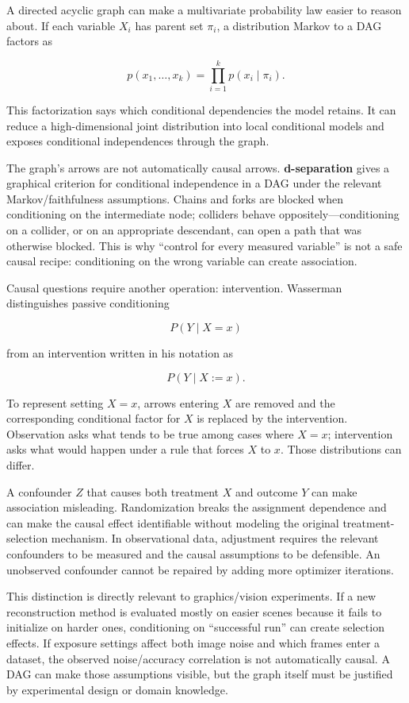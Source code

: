 \hypertarget{02-foundations-ii-ch030-a-graphical-model-can-encode-conditional-independence-without-proving-causation}{}

A directed acyclic graph can make a multivariate probability law easier to reason about. If each variable \(X_i\) has parent set \(\pi_i\), a distribution Markov to a DAG factors as

\[
p(x_1,\ldots,x_k)
=
\prod_{i=1}^{k}
p(x_i\mid \pi_i).
\]

This factorization says which conditional dependencies the model retains. It can reduce a high-dimensional joint distribution into local conditional models and exposes conditional independences through the graph.

The graph's arrows are not automatically causal arrows. \textbf{d-separation} gives a graphical criterion for conditional independence in a DAG under the relevant Markov/faithfulness assumptions. Chains and forks are blocked when conditioning on the intermediate node; colliders behave oppositely---conditioning on a collider, or on an appropriate descendant, can open a path that was otherwise blocked. This is why ``control for every measured variable'' is not a safe causal recipe: conditioning on the wrong variable can create association.

Causal questions require another operation: intervention. Wasserman distinguishes passive conditioning

\[
P(Y\mid X=x)
\]

from an intervention written in his notation as

\[
P(Y\mid X:=x).
\]

To represent setting \(X=x\), arrows entering \(X\) are removed and the corresponding conditional factor for \(X\) is replaced by the intervention. Observation asks what tends to be true among cases where \(X=x\); intervention asks what would happen under a rule that forces \(X\) to \(x\). Those distributions can differ.

A confounder \(Z\) that causes both treatment \(X\) and outcome \(Y\) can make association misleading. Randomization breaks the assignment dependence and can make the causal effect identifiable without modeling the original treatment-selection mechanism. In observational data, adjustment requires the relevant confounders to be measured and the causal assumptions to be defensible. An unobserved confounder cannot be repaired by adding more optimizer iterations.

This distinction is directly relevant to graphics/vision experiments. If a new reconstruction method is evaluated mostly on easier scenes because it fails to initialize on harder ones, conditioning on ``successful run'' can create selection effects. If exposure settings affect both image noise and which frames enter a dataset, the observed noise/accuracy correlation is not automatically causal. A DAG can make those assumptions visible, but the graph itself must be justified by experimental design or domain knowledge.

